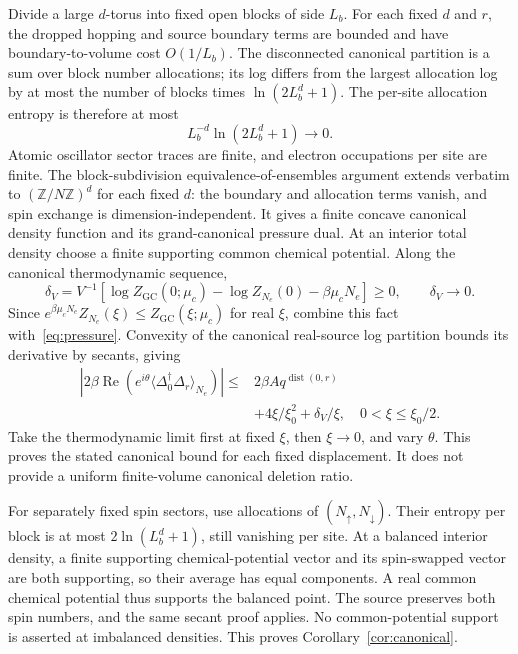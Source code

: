 \documentclass[11pt]{article}
\theoremstyle{plain}
\theoremstyle{remark}
\DeclareMathOperator{\dist}{dist}
\newcommand{\GC}{\mathrm{GC}}
\begin{document}
Divide a large $d$-torus into fixed open blocks of side $L_b$. For each fixed
$d$ and $r$, the dropped hopping and source boundary terms are bounded and
have boundary-to-volume cost $O(1/L_b)$. The disconnected canonical partition
is a sum over block number allocations; its log differs from the largest
allocation log by at most the number of blocks times $\ln(2L_b^d+1)$.
The per-site allocation entropy is therefore at most
\[
L_b^{-d}\ln(2L_b^d+1)\longrightarrow0.
\]
Atomic oscillator sector traces are finite, and electron occupations per site
are finite. The block-subdivision equivalence-of-ensembles argument extends
verbatim to $(\mathbb Z/N\mathbb Z)^d$ for each fixed $d$: the boundary and
allocation terms vanish, and spin exchange is dimension-independent.
It gives a finite concave canonical density function and its grand-canonical
pressure dual. At an interior total density choose a finite supporting common
chemical potential. Along the canonical thermodynamic sequence,
\[
\delta_V=V^{-1}[\log Z_\GC(0;\mu_c)-\log Z_{N_e}(0)-\beta\mu_cN_e]
\ge0,\qquad \delta_V\longrightarrow0.
\]
Since $e^{\beta\mu_cN_e}Z_{N_e}(\xi)\le Z_\GC(\xi;\mu_c)$ for real $\xi$,
combine this fact with~\eqref{eq:pressure}. Convexity of the canonical
real-source log partition bounds its derivative by secants, giving
\begin{equation}\label{eq:canonicalsecant}
\begin{split}
|2\beta\operatorname{Re}(e^{i\theta}
\langle\Delta_0^\dagger\Delta_r\rangle_{N_e})|
\le{}&2\beta A q^{\dist(0,r)}\\
&+4\xi/\xi_0^2+\delta_V/\xi,
\quad 0<\xi\le\xi_0/2.
\end{split}
\end{equation}
Take the thermodynamic limit first at fixed $\xi$, then $\xi\to0$, and vary
$\theta$. This proves the stated canonical bound for each fixed displacement.
It does not provide a uniform finite-volume canonical deletion ratio.

For separately fixed spin sectors, use allocations of $(N_\uparrow,N_\downarrow)$.
Their entropy per block is at most $2\ln(L_b^d+1)$, still vanishing per site.
At a balanced interior density, a finite supporting chemical-potential vector
and its spin-swapped vector are both supporting, so their average has equal
components. A real common chemical potential thus supports the balanced
point. The source preserves both spin numbers, and the same secant proof
applies. No common-potential support is asserted at imbalanced densities.
This proves Corollary~\ref{cor:canonical}.
\end{document}
